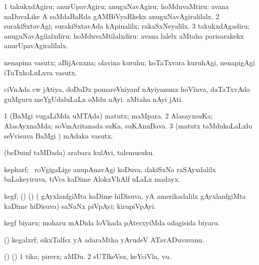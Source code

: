 \noindent
\gl{\nuga}
\bmng
\bnum
\num{1}  takukxdAgiru; anurUpavAgiru; anuguNavAgiru; hoMduvaMtiru:  avana naDavaLike A saMdaBaRda gAMBiVyaRkekx anuguNavAgiralilalx. 
\num{2}  surakiSxtavAgi; surakiSxtavAda kApinalilx; rakaSxNeyalilx. 
\num{3}  takukxdAgadiru; anuguNavAgilalxdiru; hoMduvaMtilalxdiru:  avana lalelx aMtaha parisarakekx anurUpavAgiralilalx. 
\enum
\emng
\eentry

\bentry
{}
\gl{\nA}
\bmng
nenapina vasutx; aBijAcnxna; olavina kuruhu; koTaTxvara kuruhAgi, nenapigAgi iTuTxkoLuLxva vasutx. 
\emng
\eentry

\bentry
{}
\gl{\nA}
\bmng
\banum
{} ciVnAda cw jAtiya, doDaDx pomareVniyanf nAyiyanunx hoVluva, daTaTxvAda guMguru meYgUdaluLaLx oMdu nAyi.   
 aMtaha nAyi jAti. 
\eanum
\emng
\eentry

\bentry
{}
\gl{\nA}
\bmng
\bnum
\num{1} (BaMgi \mo vugaLiMda uMTAda) matutx; maMpara. 
\num{2} AlasayxsuKa; AlasAyxnaMda; soVmAritanada suKa, suKAnuBava. 
\num{3} (matutx taMdukoLaLxlu seVvisuva BaMgi \mo) mAdaka vasutx. 
\enum
\emng
\eentry

\bentry
{}
\gl{\nA}
\bmng
(beDuinf taMDada) arabara kulAvi, talemusuku. 
\emng
\eentry

\bentry
{}
\gl{\nA}
\bmng
kepharf; \sA\ roVgigaLige anupAnavAgi koDuva, dakiSxNa raSAyxdalilx baLakeyiruva, tiVra kaDime AlokxVhAlf uLaLx madayx. 
\emng
\eentry

\bentry
{}
\gl{\nA}
\bmng
kegf; (\sA) (\birx) ( gAyxlanfgiMta kaDime hiDisuva, yA amerikadalilx  gAyxlanfgiMta kaDime hiDisuva) saNaNx piVpAyi; kirupiVpAyi. 
\emng
\eentry

\bentry
{}
\gl{\nA}
\bmng
kegf biyaru; moharu mADida loVhada pAterxyiMda odagisida biyaru. 
\emng
\eentry

\bentry
{}
\gl{\nA}
\bmng
(\ame) kegalxrf; sikxTalfsx yA adaraMtha yAvudeV ATavADuvavanu. 
\emng
\eentry

\bentry
{}
\gl{\nA}
\bmng
(\ame) (\ashi) 
\bnum
\num{1} tika; pirerx; aMDu. 
\num{2} sUTfkeVsu, keYciVla, \mo vu. 
\enum
\emng
\eentry

